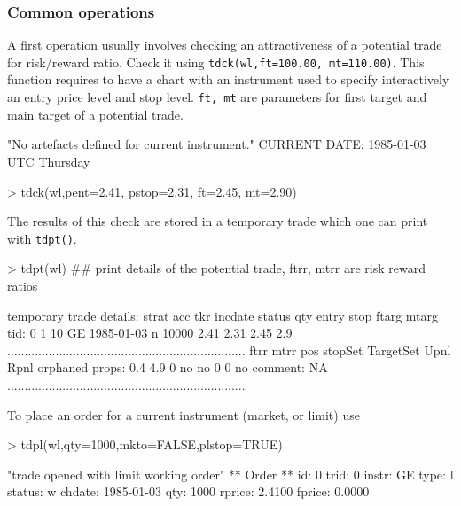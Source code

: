 \documentclass{article}
\begin{document}
\subsubsection{Common operations}
A first operation usually involves checking an attractiveness of a potential trade for risk/reward ratio. Check it using {\tt tdck(wl,ft=100.00, mt=110.00)}. This function requires to have a chart with an instrument used to specify interactively an entry price level and stop level. {\tt ft, mt} are parameters for first target and main target of a potential trade.
\begin{Schunk}
\begin{Soutput}
[1] "No artefacts defined for current instrument."
CURRENT DATE:  1985-01-03 UTC Thursday 
\end{Soutput}
\end{Schunk}
\begin{Schunk}
\begin{Sinput}
> tdck(wl,pent=2.41, pstop=2.31, ft=2.45, mt=2.90)
\end{Sinput}
\end{Schunk}
The results of this check are stored in a temporary trade which one can print with {\tt tdpt()}.
\begin{Schunk}
\begin{Sinput}
> tdpt(wl) ## print details of the potential trade, ftrr, mtrr are risk reward ratios
\end{Sinput}
\begin{Soutput}
temporary trade details:
       strat acc tkr    incdate status   qty entry stop ftarg mtarg
tid: 0     1  10  GE 1985-01-03      n 10000  2.41 2.31  2.45   2.9
.....................................................................
       ftrr mtrr pos stopSet TargetSet Upnl Rpnl orphaned
props:  0.4  4.9   0      no        no    0    0       no
comment: NA 
.....................................................................
\end{Soutput}
\end{Schunk}
To place an order for a current instrument (market, or limit) use 
\begin{Schunk}
\begin{Sinput}
> tdpl(wl,qty=1000,mkto=FALSE,plstop=TRUE)
\end{Sinput}
\begin{Soutput}
[1] "trade opened with limit working order"
 ** Order **  id: 0 trid: 0 instr: GE type: l status: w chdate: 1985-01-03 qty: 1000 rprice: 2.4100 fprice: 0.0000 
\end{Soutput}
\end{Schunk}
\end{document}

